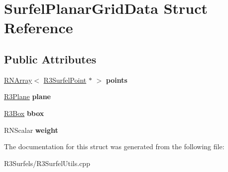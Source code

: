 \hypertarget{struct_surfel_planar_grid_data}{}\section{Surfel\+Planar\+Grid\+Data Struct Reference}
\label{struct_surfel_planar_grid_data}
\subsection*{Public Attributes}
\begin{DoxyCompactItemize}
\item 
\hyperlink{class_r_n_array}{R\+N\+Array}$<$ \hyperlink{class_r3_surfel_point}{R3\+Surfel\+Point} $\ast$ $>$ {\bfseries points}\hypertarget{struct_surfel_planar_grid_data_af4bd67e2035a96463cfcc496793347dc}{}\label{struct_surfel_planar_grid_data_af4bd67e2035a96463cfcc496793347dc}

\item 
\hyperlink{class_r3_plane}{R3\+Plane} {\bfseries plane}\hypertarget{struct_surfel_planar_grid_data_a2591f5ae2db91487d1d2ae3d1bbfc911}{}\label{struct_surfel_planar_grid_data_a2591f5ae2db91487d1d2ae3d1bbfc911}

\item 
\hyperlink{class_r3_box}{R3\+Box} {\bfseries bbox}\hypertarget{struct_surfel_planar_grid_data_ac12f37e652d06eca79325c254a067eaa}{}\label{struct_surfel_planar_grid_data_ac12f37e652d06eca79325c254a067eaa}

\item 
R\+N\+Scalar {\bfseries weight}\hypertarget{struct_surfel_planar_grid_data_a22e3b07fb163ff39afe396fd6903d274}{}\label{struct_surfel_planar_grid_data_a22e3b07fb163ff39afe396fd6903d274}

\end{DoxyCompactItemize}


The documentation for this struct was generated from the following file\+:\begin{DoxyCompactItemize}
\item 
R3\+Surfels/R3\+Surfel\+Utils.\+cpp\end{DoxyCompactItemize}
